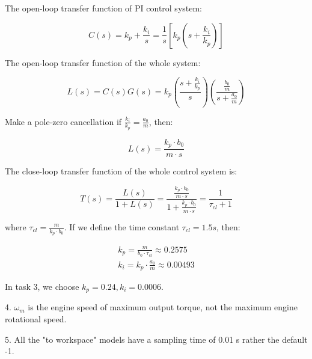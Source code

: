 \documentclass[12pt]{article}
\begin{document}
The open-loop transfer function of PI control system:

\begin{equation}
    C(s) = k_p + \frac{k_i}{s} = \frac{1}{s}[k_p(s+\frac{k_i}{k_p})]
\end{equation}

The open-loop transfer function of the whole system:

\begin{equation}
    L(s) = C(s)G(s) = k_p(\frac{s+\frac{k_i}{k_p}}{s})(\frac{\frac{b_0}{m}}{s+\frac{a_0}{m}}) 
\end{equation}

Make a pole-zero cancellation if $\frac{k_i}{k_p} = \frac{a_0}{m}$, then:

\begin{equation}
    L(s) = \frac{k_p \cdot b_0}{m\cdot s}
\end{equation}

The close-loop transfer function of the whole control system is:

\begin{equation}
    T(s) = \frac{L(s)}{1+L(s)} = \frac{\frac{k_p \cdot b_0}{m\cdot s}}{1+\frac{k_p \cdot b_0}{m\cdot s}} = 
    \frac{1}{\tau_{cl}+1}
\end{equation}

where $\tau_{cl} = \frac{m}{k_p \cdot b_0}$. If we define the time constant $\tau_{cl} = 1.5s$, then:

\begin{gather}
    k_p = \frac{m}{b_0 \cdot \tau_{cl}} \approx 0.2575 \\
    k_i = k_p \cdot \frac{a_0}{m} \approx 0.00493
\end{gather}

In task 3, we choose $k_p = 0.24, k_i = 0.0006$.

4. $\omega_m$ is the engine speed of maximum output torque, not the maximum engine rotational speed.

5. All the "to workspace" models have a sampling time of 0.01 s rather the default -1.
\end{document}

